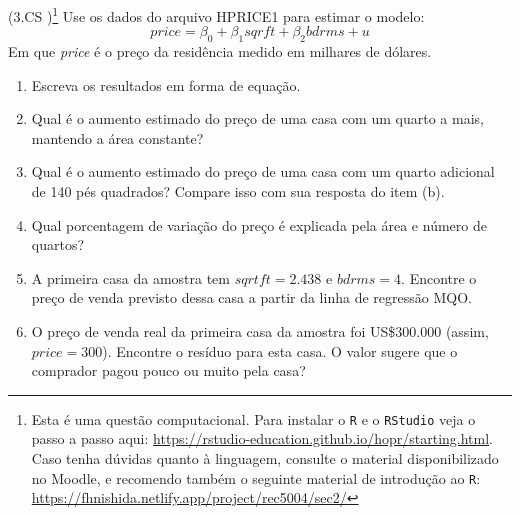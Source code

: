 \documentclass[12pt,letterpaper, onecolumn]{exam}
\begin{document}
\begin{questions}
\question (3.CS \citep{wooldridge2016})\footnote{Esta é uma questão computacional. Para instalar o \texttt{R} e o \texttt{RStudio} veja o passo a passo aqui: \href{https://rstudio-education.github.io/hopr/starting.html}{https://rstudio-education.github.io/hopr/starting.html}. Caso tenha dúvidas quanto à linguagem, consulte o material disponibilizado no Moodle, e recomendo também o seguinte material de introdução ao \texttt{R}: \href{https://fhnishida.netlify.app/project/rec5004/sec2/}{https://fhnishida.netlify.app/project/rec5004/sec2/} } Use os dados do arquivo HPRICE1 para estimar o modelo:\begin{equation*}
    price = \beta_0 + \beta_1sqrft + \beta_2bdrms + u
\end{equation*} Em que \textit{price} é o preço da residência medido em milhares de dólares.
    \begin{enumerate} [label = (\alph*)]
\item Escreva os resultados em forma de equação.
\item Qual é o aumento estimado do preço de uma casa com um quarto a mais, mantendo a área constante?
\item Qual é o aumento estimado do preço de uma casa com um quarto adicional de 140 pés quadrados? Compare isso com sua resposta do item (b).
\item Qual porcentagem de variação do preço é explicada pela área e número de quartos?
\item A primeira casa da amostra tem $sqrtft = 2.438$ e $bdrms = 4$. Encontre o preço de venda previsto dessa casa a partir da linha de regressão MQO.
\item O preço de venda real da primeira casa da amostra foi US\$300.000 (assim, $price = 300$). Encontre o resíduo para esta casa. O valor sugere que o comprador pagou pouco ou muito pela casa?
    \end{enumerate}
    
\end{questions}
\newpage

\end{document}
